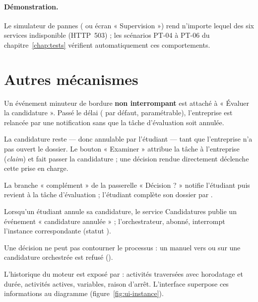 \paragraph{Démonstration.} Le simulateur de pannes ( ou écran « Supervision ») rend
n'importe lequel des six services indisponible (HTTP~503) ; les scénarios PT-04 à PT-06 du chapitre~\ref{chap:tests}
vérifient automatiquement ces comportements.

\section{Autres mécanismes}
\begin{description}[style=nextline]
  \item[Minuteur de relance] Un événement minuteur de bordure \textbf{non interrompant} est attaché à « Évaluer la
        candidature ». Passé le délai ( par défaut, paramétrable), l'entreprise est relancée par une
        notification  sans que la tâche d'évaluation soit annulée.
  \item[Prise en charge] La candidature reste  — donc annulable par l'étudiant — tant que l'entreprise
        n'a pas ouvert le dossier. Le bouton « Examiner » attribue la tâche à l'entreprise (\emph{claim}) et fait passer la
        candidature  ; une décision rendue directement déclenche cette prise en charge.
  \item[Demande de complément] La branche « complément » de la passerelle « Décision ? » notifie l'étudiant puis revient
        à la tâche d'évaluation ; l'étudiant complète son dossier par .
  \item[Annulation] Lorsqu'un étudiant annule sa candidature, le service Candidatures publie un événement
        « candidature annulée » ; l'orchestrateur, abonné, interrompt l'instance correspondante (statut ).
  \item[Cohérence] Une décision ne peut pas contourner le processus : un  manuel vers  ou
         sur une candidature orchestrée est refusé ().
  \item[Traçabilité] L'historique du moteur est exposé par  : activités
        traversées avec horodatage et durée, activités actives, variables, raison d'arrêt. L'interface superpose ces
        informations au diagramme (figure~\ref{fig:ui-instance}).
\end{description}

